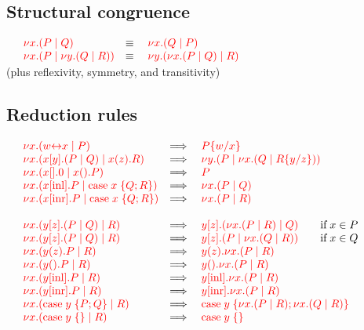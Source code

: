 \begin{figure}
  \subsection*{Structural congruence}
  \(
  \begin{array}{llll}
    & \tm{\cpCut{x}{P}{Q}}
    & \equiv \;
    & \tm{\cpCut{x}{Q}{P}}
    \\
    & \tm{\cpCut{x}{P}{\cpCut{y}{Q}{R}}}
    & \equiv \;
    & \tm{\cpCut{y}{\cpCut{x}{P}{Q}}{R}}
  \end{array}
  \)
  \\[1ex]
  (plus reflexivity, symmetry, and transitivity)
  
  \subsection*{Reduction rules}
  \(
  \begin{array}{llll}
    & \tm{\cpCut{x}{\cpLink{w}{x}}{P}}
    & \Longrightarrow \;
    & \tm{\cpSub{w}{x}{P}} 
    \\
    & \tm{\cpCut{x}{\cpSend{x}{y}{P}{Q}}{\cpRecv{x}{z}{R}}}
    & \Longrightarrow \;
    & \tm{\cpCut{y}{P}{\cpCut{x}{Q}{\cpSub{y}{z}{R}}}}
    \\
    & \tm{\cpCut{x}{\cpHalt{x}}{\cpWait{x}{P}}}
    & \Longrightarrow \;
    & \tm{P}
    \\
    & \tm{\cpCut{x}{\cpInl{x}{P}}{\cpCase{x}{Q}{R}}}
    & \Longrightarrow \;
    & \tm{\cpCut{x}{P}{Q}}
    \\
    & \tm{\cpCut{x}{\cpInr{x}{P}}{\cpCase{x}{Q}{R}}}
    & \Longrightarrow \;
    & \tm{\cpCut{x}{P}{R}}
    \\
    \\
    & \tm{\cpCut{x}{\cpSend{y}{z}{P}{Q}}{R}}
    & \Longrightarrow \;
    & \tm{\cpSend{y}{z}{\cpCut{x}{P}{R}}{Q}} \qquad \text{if} \; x \in P
    \\
    & \tm{\cpCut{x}{\cpSend{y}{z}{P}{Q}}{R}}
    & \Longrightarrow \;
    & \tm{\cpSend{y}{z}{P}{\cpCut{x}{Q}{R}}} \qquad \text{if} \; x \in Q
    \\
    & \tm{\cpCut{x}{\cpRecv{y}{z}{P}}{R}}
    & \Longrightarrow \;
    & \tm{\cpRecv{y}{z}{\cpCut{x}{P}{R}}}
    \\
    & \tm{\cpCut{x}{\cpWait{y}{P}}{R}}
    & \Longrightarrow \;
    & \tm{\cpWait{y}{\cpCut{x}{P}{R}}}
    \\
    & \tm{\cpCut{x}{\cpInl{y}{P}}{R}}
    & \Longrightarrow \;
    & \tm{\cpInl{y}{\cpCut{x}{P}{R}}}
    \\
    &\tm{\cpCut{x}{\cpInr{y}{P}}{R}}
    & \Longrightarrow \;
    & \tm{\cpInr{y}{\cpCut{x}{P}{R}}}
    \\
    & \tm{\cpCut{x}{\cpCase{y}{P}{Q}}{R}}
    & \Longrightarrow \;
    & \tm{\cpCase{y}{\cpCut{x}{P}{R}}{\cpCut{x}{Q}{R}}}
    \\
    & \tm{\cpCut{x}{\cpAbsurd{y}}{R}}
    & \Longrightarrow \;
    & \tm{\cpAbsurd{y}}
  \end{array}
  \)
  

\end{figure}
